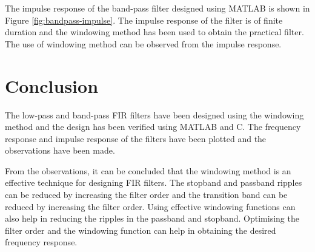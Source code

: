 \documentclass[a4paper,12pt]{article}
\begin{document}
The impulse response of the band-pass filter designed using MATLAB is shown in Figure \ref{fig:bandpass-impulse}.
The impulse response of the filter is of finite duration and the windowing method has been used to obtain the practical filter.
The use of windowing method can be observed from the impulse response.

\section*{Conclusion}
The low-pass and band-pass FIR filters
have been designed using the windowing method and the design has been verified using MATLAB and C.
The frequency response and impulse response of the filters have been plotted and the observations have been made.

From the observations, it can be concluded that the windowing method is an effective technique for designing FIR filters.
The stopband and passband ripples can be reduced by increasing the filter order and the transition band can be reduced by increasing the filter order.
Using effective windowing functions can also help in reducing the ripples in the passband and stopband.
Optimising the filter order and the windowing function can help in obtaining the desired frequency response.
\end{document}
